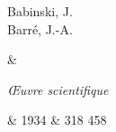 \begin{longtable}
	\addlinespace  %
	
	\begin{minipage}[t]{\linewidth}\raggedright
		Babinski, J.\\
		Barré, J.-A.
	\end{minipage} &
	\begin{minipage}[t]{\linewidth}\raggedright
		\textit{\OE{}uvre scientifique}
	\end{minipage} &
	1934 & 318 458\\
	
	\addlinespace  %
	
	
	\caption{Description du corpus Autres.} \label{tab:corpus_autres}
\end{longtable}
\normalsize
\endgroup





